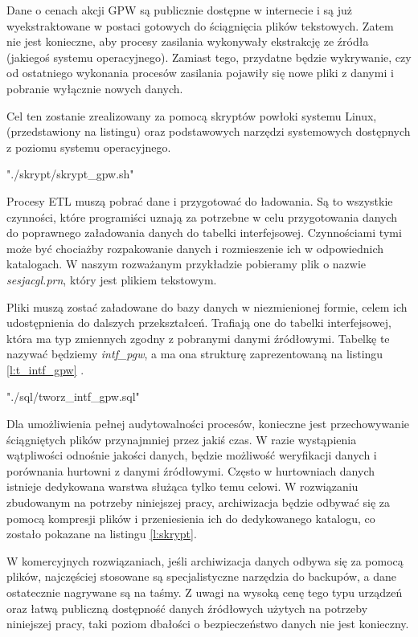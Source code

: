 Dane o cenach akcji GPW są publicznie dostępne w internecie 
 i są już wyekstraktowane w postaci gotowych do ściągnięcia plików tekstowych.
Zatem nie jest konieczne, aby procesy zasilania wykonywały ekstrakcję ze źródła (jakiegoś systemu operacyjnego).
Zamiast tego, przydatne będzie wykrywanie,
 czy od ostatniego wykonania procesów zasilania pojawiły się nowe pliki z danymi 
 i pobranie wyłącznie nowych danych.
 
Cel ten zostanie zrealizowany za pomocą skryptów powłoki systemu Linux,
 (przedstawiony na listingu)
 oraz podstawowych narzędzi systemowych dostępnych z poziomu systemu operacyjnego. 


 {"./skrypt/skrypt_gpw.sh"} 


Procesy ETL muszą pobrać dane i przygotować do ładowania. 
Są to wszystkie czynności, które programiści uznają za potrzebne 
 w celu przygotowania danych do poprawnego załadowania danych do tabelki interfejsowej.
Czynnościami tymi może być chociażby rozpakowanie danych i rozmieszenie ich w odpowiednich katalogach.
W naszym rozważanym przykładzie pobieramy plik o nazwie \textit{sesjacgl.prn},
 który jest plikiem tekstowym.

Pliki muszą zostać załadowane do bazy danych w niezmienionej formie, celem ich udostępnienia do dalszych przekształceń.
Trafiają one do tabelki interfejsowej,
 która ma typ zmiennych zgodny z pobranymi danymi źródłowymi. 
Tabelkę te nazywać będziemy \textit{intf\_pgw},
 a ma ona strukturę zaprezentowaną na listingu \ref{l:t_intf_gpw} .

 {"./sql/tworz_intf_gpw.sql"} 


Dla umożliwienia pełnej audytowalności procesów,
 konieczne jest przechowywanie ściągniętych plików przynajmniej przez jakiś czas.
W razie wystąpienia wątpliwości odnośnie jakości danych,
 będzie możliwość weryfikacji danych i porównania hurtowni z danymi źródłowymi. 
Często w hurtowniach danych istnieje dedykowana warstwa służąca tylko temu celowi. 
W rozwiązaniu zbudowanym na potrzeby niniejszej pracy,
 archiwizacja będzie odbywać się za pomocą kompresji plików i przeniesienia ich do dedykowanego katalogu, 
 co zostało pokazane na listingu \ref{l:skrypt}. 
 
W komercyjnych rozwiązaniach, jeśli archiwizacja danych odbywa się za pomocą plików,
 najczęściej stosowane są specjalistyczne narzędzia do backupów,
 a dane ostatecznie nagrywane są na taśmy.
Z uwagi na wysoką cenę tego typu urządzeń 
 oraz łatwą publiczną dostępność danych źródłowych użytych na potrzeby niniejszej pracy, 
 taki poziom dbałości o bezpieczeństwo danych nie jest konieczny. 


